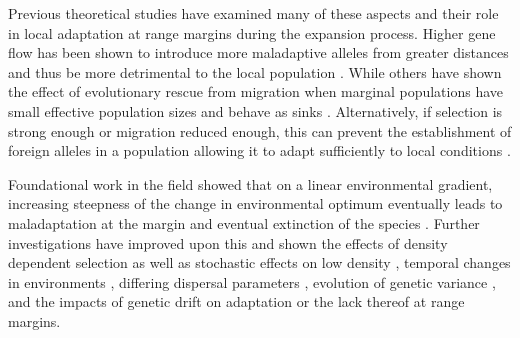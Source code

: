 Previous theoretical studies have examined many of these aspects and their role in local adaptation at range margins during the expansion process. Higher gene flow has been shown to introduce more maladaptive alleles from greater distances and thus be more detrimental to the local population \citep{GarciaRamos:1997}. While others have shown the effect of evolutionary rescue from migration when marginal populations have small effective population sizes and behave as sinks \citep{Holt:1997,Gomulkiewicz:1999,Ching:2012}. Alternatively, if selection is strong enough or migration reduced enough, this can prevent the establishment of foreign alleles in a population allowing it to adapt sufficiently to local conditions \citep{Ronce:2001}. 

Foundational work in the field showed that on a linear environmental gradient, increasing steepness of the change in environmental optimum eventually leads to maladaptation at the margin and eventual extinction of the species \citep{Kirkpatrick:1997}. %
Further investigations have improved upon this and shown the effects of density dependent selection \citep{GarciaRamos:1997} as well as stochastic effects on low density \citep{Bridle:2010}, temporal changes in environments \citep{Pease:1989}, differing dispersal parameters \citep{Aguilee:2012}, evolution of genetic variance \citep{Barton:2001,Polechova:2009}, and the impacts of genetic drift  \citep{Polechova:2015} on adaptation or the lack thereof at range margins. %
